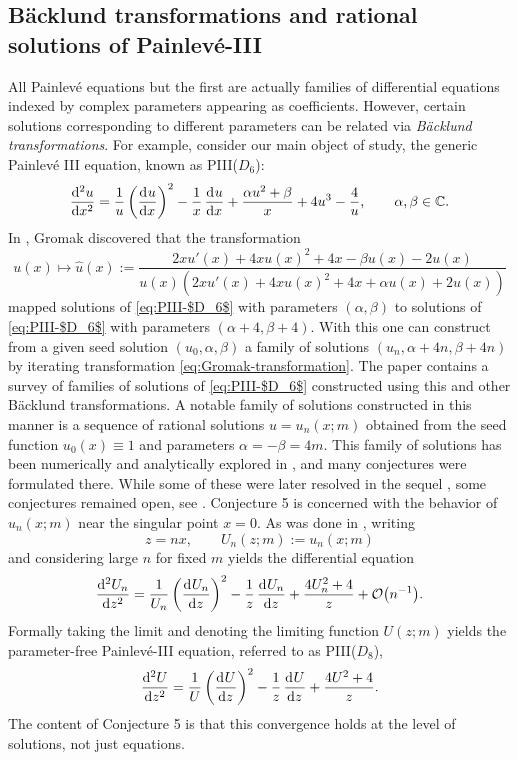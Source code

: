 \documentclass[11pt]{article}
\numberwithin{equation}{section}
\numberwithin{equation}{section}
\newcommand{\C}{{\mathbb{C}}}
\begin{document}
\subsection{B\"acklund transformations and rational solutions of Painlev\'e-III}
All Painlev\'e equations but the first are actually families of differential equations indexed by complex parameters appearing as coefficients. However, certain solutions corresponding to different parameters can be related via \emph{B\"acklund transformations}. For example, consider our main object of study, the generic Painlev\'e III equation, known as PIII($D_6$):
\begin{equation}
\dod[2]{u}{x}=\dfrac{1}{u}\left( \dod{u}{x} \right)^2-\dfrac{1}{x} \dod{u}{x} + \dfrac{\alpha u^2 + \beta}{x}+4u^3-\frac{4}{u}, \qquad \alpha,\beta \in \C.
\label{eq:PIII-$D_6$}
\end{equation}
In \cite{Gromak}, Gromak discovered that the transformation
\begin{equation}
 u(x) \mapsto \hat{u}(x) := \dfrac{2xu'(x) + 4xu(x)^2 + 4x -\beta u(x) - 2u(x)}{u(x) ( 2xu'(x) + 4x u(x)^2 +4x + \alpha u(x) + 2u(x) )}
\label{eq:Gromak-transformation}
\end{equation}
mapped solutions of \eqref{eq:PIII-$D_6$} with parameters $(\alpha, \beta)$ to solutions of \eqref{eq:PIII-$D_6$} with parameters $(\alpha + 4,\allowbreak \beta+4)$. With this one can construct from a given seed solution $(u_0, \alpha, \beta)$ a family of solutions $(u_n, \alpha + 4n, \beta + 4n)$ by iterating transformation \eqref{eq:Gromak-transformation}. The paper \cite{MCB} contains a survey of families of solutions of \eqref{eq:PIII-$D_6$} constructed using this and other B\"acklund transformations. A notable family of solutions constructed in this manner is a sequence of rational solutions $u=u_n(x;m)$ obtained from the seed function $u_0(x) \equiv 1$ and parameters $\alpha = -\beta = 4m$. This family of solutions has been numerically and analytically explored in \cite{BMS18}, and many conjectures were formulated there. While some of these were later resolved in the sequel \cite{BM20}, some conjectures remained open, see \cite[Conjectures 4 and 5]{BMS18}. Conjecture 5 is concerned with the behavior of $u_n(x;m)$ near the singular point $x = 0$. As was done in \cite{BMS18}, writing \[z = nx,\qquad U_n(z;m):= u_n(x;m)\] and considering large $n$ for fixed $m$ yields the differential equation
\[
\dod[2]{U_n}{z} = \dfrac{1}{U_n} \left( \dod{U_n}{z}\right)^2 - \dfrac{1}{z} \dod{U_n}{z} + \dfrac{4U_n^2 + 4}{z} + \mathcal{O}\big(n^{-1}\big).
\]
Formally taking the limit and denoting the limiting function $U(z;m)$ yields the parameter-free Painlev\'e-III equation, referred to as PIII($D_8$),
\begin{equation}
\dod[2]{U}{z}=\dfrac{1}{U}\left( \dod{U}{z}\right)^2-\dfrac{1}{z} \dod{U}{z} + \dfrac{4U^2 + 4}{z}.
\label{eq:PIII-$D_8$}
\end{equation}
The content of Conjecture 5 is that this convergence holds at the level of solutions, not just equations.
\end{document}
